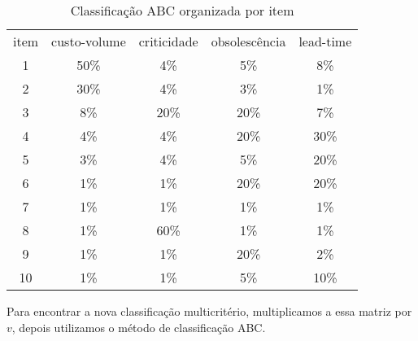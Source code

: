 \documentclass{book}
\begin{document}
\begin{table}[h]
\begin{center}
\begin{tabular}[c]{c | c c c c}
item & \multicolumn{1}{c}{custo-volume} & \multicolumn{1}{c}{criticidade} & \multicolumn{1}{c}{obsolescência} & \multicolumn{1}{c}{lead-time} \\
1  & 50\% &  4\% &  5\% &  8\% \\
2  & 30\% &  4\% &  3\% &  1\% \\
3  &  8\% & 20\% & 20\% &  7\% \\
4  &  4\% &  4\% & 20\% & 30\% \\
5  &  3\% &  4\% &  5\% & 20\% \\
6  &  1\% &  1\% & 20\% & 20\% \\
7  &  1\% &  1\% &  1\% &  1\% \\
8  &  1\% & 60\% &  1\% &  1\% \\
9  &  1\% &  1\% & 20\% &  2\% \\
10 &  1\% &  1\% &  5\% & 10\% \\
\end{tabular}
\caption{Classificação ABC organizada por item}
\label{tab:classABCPerc}
\end{center}
\end{table}

Para encontrar a nova classificação multicritério, multiplicamos a essa matriz por $v$, depois utilizamos o método de classificação ABC.
\end{document}
